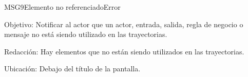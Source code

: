 \begin{mensaje}{MSG9}{Elemento no referenciado}{Error}
	\item [Objetivo:] Notificar al actor que un actor, entrada, salida, regla de negocio o mensaje no está siendo utilizado en las trayectorias.
	\item[Redacción:] Hay elementos que no están siendo utilizados en las trayectorias.
	\item [Ubicación:] Debajo del título de la pantalla.
\end{mensaje}